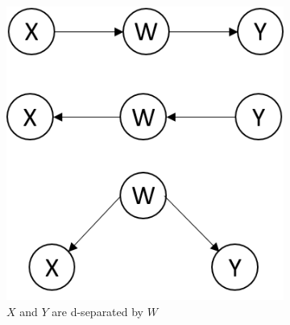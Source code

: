 \begin{refsection}
\begin{figure}[H]
	\centering
	\begin{subfigure}[b]{0.3\textwidth}
		\includegraphics[width=\textwidth]{../figures/statisticalModeling/d-separationScheme}
		\caption{$X$ and $Y$ are d-separated by $W$}
	\end{subfigure}\quad
	\begin{subfigure}[b]{0.3\textwidth}

\end{subfigure}
\end{figure}
\end{refsection}
